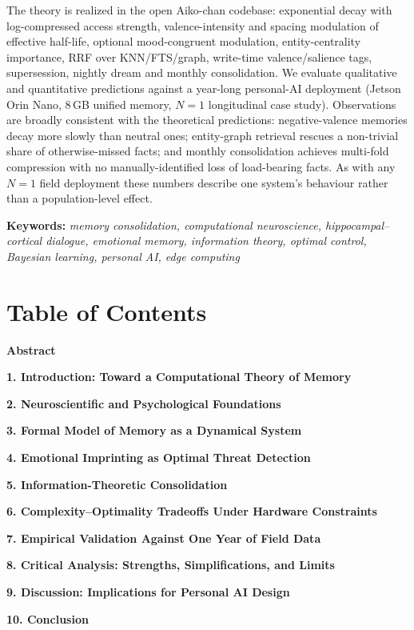\documentclass[]{article}
\begin{document}
The theory is realized in the open Aiko-chan codebase: exponential decay
with log-compressed access strength, valence-intensity and spacing
modulation of effective half-life, optional mood-congruent modulation,
entity-centrality importance, RRF over KNN/FTS/graph, write-time
valence/salience tags, supersession, nightly dream and monthly
consolidation. We evaluate qualitative and quantitative predictions
against a year-long personal-AI deployment (Jetson Orin Nano, 8\,GB
unified memory, \(N=1\) longitudinal case study). Observations are
broadly consistent with the theoretical predictions: negative-valence
memories decay more slowly than neutral ones; entity-graph retrieval
rescues a non-trivial share of otherwise-missed facts; and monthly
consolidation achieves multi-fold compression with no
manually-identified loss of load-bearing facts. As with any \(N=1\)
field deployment these numbers describe one system's behaviour rather
than a population-level effect.

\textbf{Keywords:} \emph{memory consolidation, computational
neuroscience, hippocampal--cortical dialogue, emotional memory,
information theory, optimal control, Bayesian learning, personal AI,
edge computing}

\hypertarget{table-of-contents}{%
\section{\texorpdfstring{\textbf{Table of
Contents}}{Table of Contents}}\label{table-of-contents}}

\textbf{Abstract}

\textbf{1. Introduction: Toward a Computational Theory of Memory}

\textbf{2. Neuroscientific and Psychological Foundations}

\textbf{3. Formal Model of Memory as a Dynamical System}

\textbf{4. Emotional Imprinting as Optimal Threat Detection}

\textbf{5. Information-Theoretic Consolidation}

\textbf{6. Complexity--Optimality Tradeoffs Under Hardware Constraints}

\textbf{7. Empirical Validation Against One Year of Field Data}

\textbf{8. Critical Analysis: Strengths, Simplifications, and Limits}

\textbf{9. Discussion: Implications for Personal AI Design}

\textbf{10. Conclusion}
\end{document}

